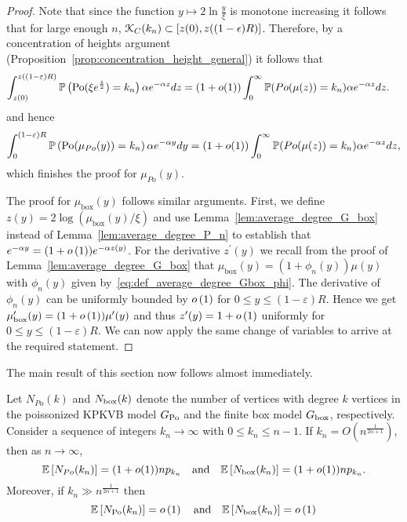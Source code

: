 \begin{proof}
Note that since the function $y \mapsto 2\ln \frac{y}{\xi}$ is monotone increasing it follows that for large enough $n$, 
${\mathcal K}_C(k_n)\subset [z(0),z((1-\epsilon)R)]$. Therefore, by a concentration of heights argument (Proposition~\ref{prop:concentration_height_general}) it follows that
\begin{align*}
	\int_{z(0)}^{z((1-\varepsilon)R)} \mathbb{P}\left({\mathrm{Po}}(\xi e^{\frac{z}{2}})=k_n\right)\alpha e^{-\alpha z} dz 
	&= (1+o(1))\int_0^\infty \mathbb{P}(Po(\mu(z))=k_n)\alpha e^{-\alpha z}dz.
\end{align*}
and hence
\[
	\int_0^{(1-\varepsilon)R} \mathbb{P}\left({\mathrm{Po}}(\mu_{Po}(y))=k_n\right) \alpha e^{-\alpha y}dy
	= (1+o(1))\int_0^\infty \mathbb{P}(Po(\mu(z))=k_n)\alpha e^{-\alpha z}dz,
\]
which finishes the proof for $\mu_{Po}(y)$.

The proof for $\mu_{\mathrm{box}}(y)$ follows similar arguments. First, we define $z(y) = 2 \log (\mu_{\mathrm{box}}(y)/\xi)$ and use Lemma~\ref{lem:average_degree_G_box} instead of Lemma~\ref{lem:average_degree_P_n} to establish that $e^{-\alpha y} = (1+o\left(1\right))e^{-\alpha z(y)}$. For the derivative $z^\prime(y)$ we recall from the proof of Lemma~\ref{lem:average_degree_G_box} that $\mu_{\mathrm{box}}(y) = (1 + \phi_n(y)) \mu(y)$ with $\phi_n(y)$ given by~\eqref{eq:def_average_degree_Gbox_phi}. The derivative of $\phi_n(y)$ can be uniformly bounded by $o\left(1\right)$ for $0 \le y \le (1-\varepsilon)R$. Hence we get $\mu_{\mathrm{box}}^\prime(y) = (1+o\left(1\right)) \mu^\prime(y)$ and thus $z^\prime(y) = 1 + o\left(1\right)$ uniformly for $0 \le y \le (1-\varepsilon)R$. We can now apply the same change of variables to arrive at the required statement.

\end{proof}

The main result of this section now follows almost immediately.

\begin{lemma}\label{lem:expnnkn}
Let $N_{Po}(k)$ and $N_{\text{box}}(k)$ denote the number of vertices with degree $k$ vertices in the poissonized KPKVB model $G_{{\mathrm{Po}}}$ and the finite box model $G_{\mathrm{box}}$, respectively. Consider a sequence of integers $k_n\rightarrow\infty$ with $0 \leq k_n \leq n-1$.	If $k_n = O\left(n^{\frac{1}{2\alpha+1}}\right)$, then as $n \to \infty$,
\[
	\mathbb{E}\left[N_{Po}(k_n)\right] =(1+o(1)) n p_{k_n} \quad \text{and} \quad \mathbb{E}\left[N_{\text{box}}(k_n)\right] =(1+o(1)) n p_{k_n}.
\]
Moreover, if $k_n \gg n^{\frac{1}{2\alpha + 1}}$ then
\[
	\mathbb{E}\left[N_{{\mathrm{Po}}}(k_n)\right] = o\left(1\right) \quad \text{and} \quad \mathbb{E}\left[N_{\text{box}}(k_n)\right] = o\left(1\right)
\]
\end{lemma}

